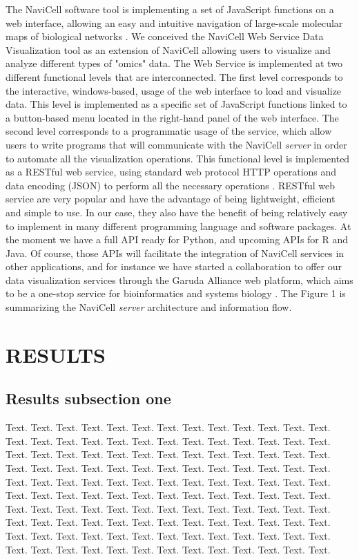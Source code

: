 \documentclass[a4,center,fleqn]{NAR}
\begin{document}
The NaviCell software tool is implementing a set of JavaScript functions on a
web interface, allowing an easy and intuitive navigation of large-scale
molecular maps of biological networks \cite{kuperstein2013navicell}. We
conceived the NaviCell Web Service Data Visualization tool as an extension of
NaviCell allowing users to visualize and analyze different types of "omics"
data. The Web Service is implemented at two different functional levels that are
interconnected. The first level corresponds to the interactive, windows-based,
usage of the web interface to load and visualize data. This level is implemented
as a specific set of JavaScript functions linked to a button-based menu located
in the right-hand panel of the web interface. The second level corresponds to a
programmatic usage of the service, which allow users to write programs that will
communicate with the NaviCell \emph{server} in order to automate all the
visualization operations. This functional level is implemented as a RESTful web
service, using standard web protocol HTTP operations and data encoding (JSON)
to perform all the necessary operations \cite{fielding2002principled}.
RESTful web service are very popular and have the advantage of being
lightweight, efficient and simple to use. In our case, they also have the benefit of
being relatively easy to implement in many different programming language and
software packages. At the moment we have a full API ready for Python, and
upcoming APIs for R and Java. Of course, those APIs will facilitate the
integration of NaviCell services in other applications, and for instance we
have started a collaboration to offer our data visualization services through
the Garuda Alliance web platform, which aims to be a one-stop service for
bioinformatics and systems biology \cite{ghosh2011software}. The Figure 1 is
summarizing the NaviCell \emph{server} architecture and information flow.



\section{RESULTS}

\subsection{Results subsection one}

Text. Text. Text. Text. Text. Text. Text. Text. Text. Text. Text.
Text. Text. Text. Text. Text. Text. Text. Text. Text. Text. Text.
Text. Text. Text. Text. Text. Text. Text. Text. Text. Text. Text.
Text. Text. Text. Text. Text. Text. Text. Text. Text. Text. Text.
Text. Text. Text. Text. Text. Text. Text. Text. Text. Text. Text.
Text. Text. Text. Text. Text. Text. Text. Text. Text. Text. Text.
Text. Text. Text. Text. Text. Text. Text. Text. Text. Text. Text.
Text. Text. Text. Text. Text. Text. Text. Text. Text. Text. Text.
Text. Text. Text. Text. Text. Text. Text. Text. Text. Text. Text.
Text. Text. Text. Text. Text. Text. Text. Text. Text. Text. Text.
Text. Text. Text. Text. Text. Text. Text. Text. Text. Text. Text.
Text. Text. Text. Text. Text. Text. Text. Text. Text.
\end{document}
